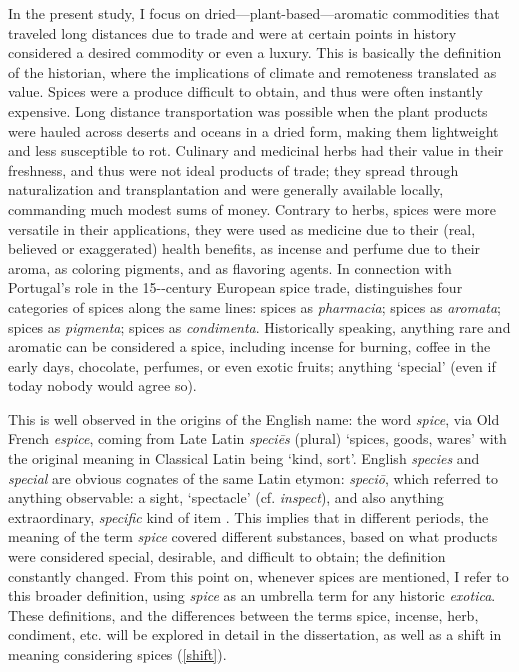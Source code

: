 In the present study, I focus on dried---plant-based---aromatic commodities that traveled long distances due to trade and were at certain points in history considered a desired commodity or even a luxury. This is basically the definition of the historian, where the implications of climate and remoteness translated as value. Spices were a produce difficult to obtain, and thus were often instantly expensive. Long distance transportation was possible when the plant products were hauled across deserts and oceans in a dried form, making them lightweight and less susceptible to rot. Culinary and medicinal herbs had their value in their freshness, and thus were not ideal products of trade; they spread through naturalization and transplantation and were generally available locally, commanding much modest sums of money. Contrary to herbs, spices were more versatile in their applications, they were used as medicine due to their (real, believed or exaggerated) health benefits, as incense and perfume due to their aroma, as coloring pigments, and as flavoring agents. In connection with Portugal's role in the 15--century European spice trade, \textcite{halikowski_smith_portugal_2001} distinguishes four categories of spices along the same lines: spices as \textit{pharmacia}; spices as \textit{aromata}; spices as \textit{pigmenta}; spices as \textit{condimenta}. Historically speaking, anything rare and aromatic can be considered a spice, including incense for burning, coffee in the early days, chocolate, perfumes, or even exotic fruits; anything `special' (even if today nobody would agree so).

This is well observed in the origins of the English name: the word \textit{spice}, via Old French \textit{espice}, coming from Late Latin \textit{speciēs} (plural) `spices, goods, wares' with the original meaning in Classical Latin being `kind, sort'. English \textit{species} and \textit{special} are obvious cognates of the same Latin etymon: \textit{speciō}, which referred to anything observable: a sight, `spectacle' (cf. \textit{inspect}), and also anything extraordinary, \textit{specific} kind of item \autocite[1983-84]{glare_oxford_2012}. This implies that in different periods, the meaning of the term \textit{spice} covered different substances, based on what products were considered special, desirable, and difficult to obtain; the definition constantly changed. From this point on, whenever spices are mentioned, I refer to this broader definition, using \textit{spice} as an umbrella term for any historic \textit{exotica}. These definitions, and the differences between the terms spice, incense, herb, condiment, etc. will be explored in detail in the dissertation, as well as a shift in meaning considering spices (\cref{shift}).




